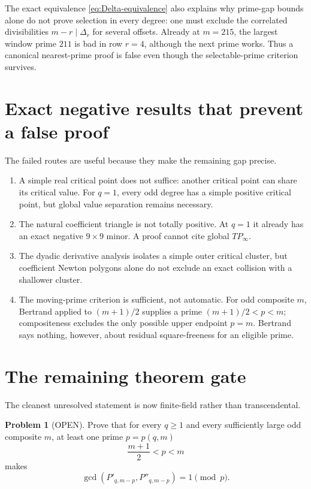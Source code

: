 \documentclass[11pt]{article}
\theoremstyle{keio}
\theoremstyle{definition}
\newtheorem{problem}[theorem]{Problem}
\theoremstyle{remark}
\newcommand{\OPEN}{\textcolor{keioopen}{\textsf{OPEN}}}
\begin{document}
The exact equivalence \eqref{eq:Delta-equivalence} also explains why
prime-gap bounds alone do not prove selection in every degree: one must
exclude the correlated divisibilities $m-r\mid\Delta_r$ for several
offsets. Already at $m=215$, the largest window prime $211$ is bad in row
$r=4$, although the next prime works. Thus a canonical nearest-prime proof
is false even though the selectable-prime criterion survives.

\section{Exact negative results that prevent a false proof}

The failed routes are useful because they make the remaining gap precise.
\begin{enumerate}
\item A simple real critical point does not suffice: another critical point
can share its critical value. For $q=1$, every odd degree has a simple
positive critical point, but global value separation remains necessary.
\item The natural coefficient triangle is not totally positive. At $q=1$
it already has an exact negative $9\times9$ minor. A proof cannot cite global
$TP_\infty$.
\item The dyadic derivative analysis isolates a simple outer critical
cluster, but coefficient Newton polygons alone do not exclude an exact
collision with a shallower cluster.
\item The moving-prime criterion is sufficient, not automatic. For odd
composite $m$, Bertrand applied to $(m+1)/2$ supplies a prime
$(m+1)/2<p<m$; compositeness excludes the only possible upper endpoint
$p=m$. Bertrand says nothing, however, about residual square-freeness for
an eligible prime.
\end{enumerate}

\section{The remaining theorem gate}

The cleanest unresolved statement is now finite-field rather than
transcendental.

\begin{problem}[\OPEN]
Prove that for every $q\ge1$ and every sufficiently large odd composite $m$,
at least one prime $p=p(q,m)$
\[
\frac{m+1}{2}<p<m
\]
makes
\[
\gcd(P'_{q,m-p},P''_{q,m-p})=1\pmod p.
\]
\end{problem}
\end{document}

